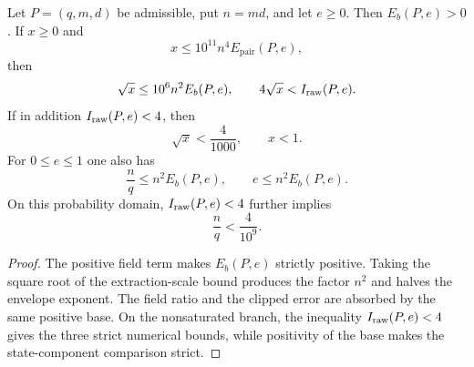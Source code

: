 \begin{theorem}
\label{thm:pauli-final-degree-two-scalar-support}
\leanok
{}
Let $P=(q,m,d)$ be admissible, put $n=md$, and let $e\geq0$.  Then
$E_b(P,e)>0$.  If $x\geq0$ and
\[
 x\leq10^{11}n^4E_{\mathrm{pair}}(P,e),
\]
then
\[
 \sqrt{x}\leq10^6n^2E_b(P,e),
 \qquad
 4\sqrt{x}<I_{\rm raw}(P,e).
\]
If in addition $I_{\rm raw}(P,e)<4$, then
\[
 \sqrt{x}<\frac4{1000},\qquad x<1.
\]
For $0\leq e\leq1$ one also has
\[
 \frac nq\leq n^2E_b(P,e),
 \qquad
 e\leq n^2E_b(P,e).
\]
On this probability domain, $I_{\rm raw}(P,e)<4$ further implies
\[
 \frac nq<\frac4{10^9}.
\]
\end{theorem}
\begin{proof}
\leanok
{}
The positive field term makes $E_b(P,e)$ strictly positive.  Taking the
square root of the extraction-scale bound produces the factor $n^2$ and halves
the envelope exponent.  The field ratio and the clipped error are absorbed by
the same positive base.  On the nonsaturated branch, the inequality
$I_{\rm raw}(P,e)<4$ gives the three strict numerical bounds, while positivity
of the base makes the state-component comparison strict.
\end{proof}

